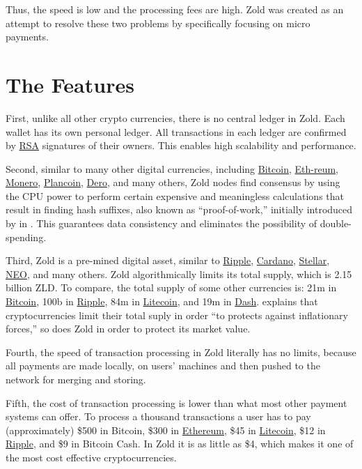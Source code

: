 \documentclass{main}
\begin{document}
Thus, the speed is low and the processing fees are high.
Zold was created as an attempt to resolve these two problems
by specifically focusing on micro payments.

\pagebreak

\section*{The Features}

First, unlike all other crypto currencies, there is no central ledger in Zold.
Each wallet has its own personal ledger.
All transactions in each ledger are confirmed by
\href{https://en.wikipedia.org/wiki/RSA_(cryptosystem)}{RSA} signatures of their owners.
This enables high scalability and performance.

Second, similar to many other digital currencies, including
\href{https://bitcoin.org/}{Bit\-coin},
\href{https://ethereum.org/}{Eth-reum},
\href{https://getmonero.org/}{Mone\-ro},
\href{https://plancoin.co/}{Plancoin},
\href{https://dero.io/}{Dero},
and many others, Zold nodes find consensus by using the CPU power to perform certain expensive and meaningless calculations
that result in finding hash suffixes, also known as ``proof-of-work,''
initially introduced by  in \citeyear{back1997}.
This guarantees data consistency and eliminates the possibility of double-spending.

Third, Zold is a pre-mined digital asset, similar to
\href{https://ripple.com/}{Ripple},
\href{https://www.cardano.org/en/home/}{Cardano},
\href{https://www.stellar.org/}{Stellar},
\href{https://neo.org/}{NEO}, and many others.
Zold algorithmically limits its total supply, which is 2.15 billion ZLD.
To compare, the total supply of some other currencies is:
21m in \href{https://bitcoin.org/}{Bitcoin},
100b in \href{https://ripple.com/}{Ripple},
84m in \href{https://litecoin.org/}{Litecoin},
and
19m in \href{https://www.dash.org/}{Dash}.
 explains that cryptocurrencies limit their
total suply in order ``to protects against inflationary forces,''
so does Zold in order to protect its market value.

Fourth, the speed of transaction processing in Zold
literally has no limits, because all payments are made locally, on users'
machines and then pushed to the network for merging and storing.

Fifth, the cost of transaction processing
is lower than what most other payment systems can offer. To process
a thousand transactions a user has to pay (approximately) \$500 in Bitcoin, \$300 in \href{https://ethereum.org/}{Ethereum},
\$45 in \href{https://litecoin.org/}{Litecoin}, \$12 in \href{https://ripple.com/}{Ripple}, and \$9 in Bitcoin Cash.
In Zold it is as little as \$4, which makes it one of the most cost effective
cryptocurrencies.
\end{document}
